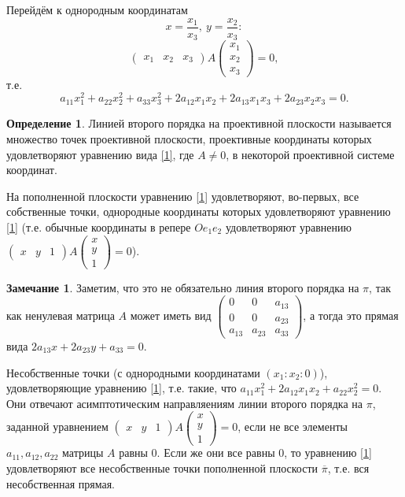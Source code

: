 \documentclass[a4paper, 12pt]{article}
\theoremstyle{definition}
\newtheorem*{definition}{Определение}
\newtheorem*{remark}{Замечание}
\begin{document}
Перейдём к однородным координатам
\[ x = \frac{x_1}{x_3}, \ y = \frac{x_2}{x_3}: \]
\begin{equation} \label{1}
    \begin{pmatrix} x_1 & x_2 & x_3 \end{pmatrix} A \begin{pmatrix} x_1 \\ x_2 \\ x_3 \end{pmatrix} = 0,
\end{equation}
т.е.
\[ a_{11} x_1^2 + a_{22} x_2^2 + a_{33} x_3^2 + 2a_{12} x_1 x_2 + 2a_{13} x_1 x_3 + 2a_{23} x_2 x_3 = 0. \]

\begin{definition}
    Линией второго порядка на проективной плоскости называется множество точек проективной плоскости, проективные координаты которых удовлетворяют уравнению вида \eqref{1}, где $A \neq 0$, в некоторой проективной системе координат.
\end{definition}

На пополненной плоскости уравнению \eqref{1} удовлетворяют, во-первых, все собственные точки, однородные координаты которых удовлетворяют уравнению \eqref{1} (т.е. обычные координаты в репере $Oe_1e_2$ удовлетворяют уравнению $ \begin{pmatrix} x&y&1 \end{pmatrix} A \begin{pmatrix} x \\ y \\ 1 \end{pmatrix} = 0$).

\begin{remark}
    Заметим, что это не обязательно линия второго порядка на $\pi$, так как ненулевая матрица $A$ может иметь вид $\begin{pmatrix} 0&0&a_{13} \\ 0&0&a_{23} \\ a_{13}&a_{23}&a_{33} \end{pmatrix}$, а тогда это прямая вида $2a_{13}x + 2a_{23}y + a_{33} = 0$.
\end{remark}

Несобственные точки (с однородными координатами $(x_1 : x_2 : 0)$), удовлетворяющие уравнению \eqref{1}, т.е. такие, что $a_{11}x_1^2 + 2a_{12} x_1 x_2 + a_{22} x_2^2 = 0$.
Они отвечают асимптотическим направляениям линии второго порядка на $\pi$, заданной уравнением $ \begin{pmatrix} x&y&1 \end{pmatrix} A \begin{pmatrix} x \\ y \\ 1 \end{pmatrix} = 0$, если не все элементы $a_{11}, a_{12}, a_{22}$ матрицы $A$ равны $0$.
Если же они все равны $0$, то уравнению \eqref{1} удовлетворяют все несобственные точки пополненной плоскости $\overline{\pi}$, т.е. вся несобственная прямая.
\end{document}
